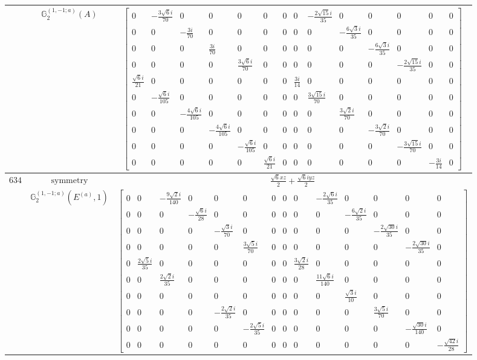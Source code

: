 \documentclass[fleqn,8pt,landscape]{jsarticle}
\begin{document}
\begin{longtable}{ccc}
$  $ & $ \mathbb{G}_{2}^{(1,-1;a)}(A) $ & $ \begin{bmatrix} 0 & - \frac{3 \sqrt{6} i}{70} & 0 & 0 & 0 & 0 & 0 & 0 & - \frac{2 \sqrt{15} i}{35} & 0 & 0 & 0 & 0 & 0 \\ 0 & 0 & - \frac{3 i}{70} & 0 & 0 & 0 & 0 & 0 & 0 & - \frac{6 \sqrt{3} i}{35} & 0 & 0 & 0 & 0 \\ 0 & 0 & 0 & \frac{3 i}{70} & 0 & 0 & 0 & 0 & 0 & 0 & - \frac{6 \sqrt{3} i}{35} & 0 & 0 & 0 \\ 0 & 0 & 0 & 0 & \frac{3 \sqrt{6} i}{70} & 0 & 0 & 0 & 0 & 0 & 0 & - \frac{2 \sqrt{15} i}{35} & 0 & 0 \\ \frac{\sqrt{6} i}{21} & 0 & 0 & 0 & 0 & 0 & 0 & \frac{3 i}{14} & 0 & 0 & 0 & 0 & 0 & 0 \\ 0 & - \frac{\sqrt{6} i}{105} & 0 & 0 & 0 & 0 & 0 & 0 & \frac{3 \sqrt{15} i}{70} & 0 & 0 & 0 & 0 & 0 \\ 0 & 0 & - \frac{4 \sqrt{6} i}{105} & 0 & 0 & 0 & 0 & 0 & 0 & \frac{3 \sqrt{2} i}{70} & 0 & 0 & 0 & 0 \\ 0 & 0 & 0 & - \frac{4 \sqrt{6} i}{105} & 0 & 0 & 0 & 0 & 0 & 0 & - \frac{3 \sqrt{2} i}{70} & 0 & 0 & 0 \\ 0 & 0 & 0 & 0 & - \frac{\sqrt{6} i}{105} & 0 & 0 & 0 & 0 & 0 & 0 & - \frac{3 \sqrt{15} i}{70} & 0 & 0 \\ 0 & 0 & 0 & 0 & 0 & \frac{\sqrt{6} i}{21} & 0 & 0 & 0 & 0 & 0 & 0 & - \frac{3 i}{14} & 0 \end{bmatrix} $ \\ \hline
$ 634 $ & $ \text{symmetry} $ & $ \frac{\sqrt{6} x z}{2} + \frac{\sqrt{6} i y z}{2} $ \\
$  $ & $ \mathbb{G}_{2}^{(1,-1;a)}(E^{(a)},1) $ & $ \begin{bmatrix} 0 & 0 & - \frac{9 \sqrt{2} i}{140} & 0 & 0 & 0 & 0 & 0 & 0 & - \frac{2 \sqrt{6} i}{35} & 0 & 0 & 0 & 0 \\ 0 & 0 & 0 & - \frac{\sqrt{6} i}{28} & 0 & 0 & 0 & 0 & 0 & 0 & - \frac{6 \sqrt{2} i}{35} & 0 & 0 & 0 \\ 0 & 0 & 0 & 0 & - \frac{\sqrt{3} i}{70} & 0 & 0 & 0 & 0 & 0 & 0 & - \frac{2 \sqrt{30} i}{35} & 0 & 0 \\ 0 & 0 & 0 & 0 & 0 & \frac{3 \sqrt{5} i}{70} & 0 & 0 & 0 & 0 & 0 & 0 & - \frac{2 \sqrt{30} i}{35} & 0 \\ 0 & \frac{2 \sqrt{5} i}{35} & 0 & 0 & 0 & 0 & 0 & 0 & \frac{3 \sqrt{2} i}{28} & 0 & 0 & 0 & 0 & 0 \\ 0 & 0 & \frac{2 \sqrt{2} i}{35} & 0 & 0 & 0 & 0 & 0 & 0 & \frac{11 \sqrt{6} i}{140} & 0 & 0 & 0 & 0 \\ 0 & 0 & 0 & 0 & 0 & 0 & 0 & 0 & 0 & 0 & \frac{\sqrt{3} i}{10} & 0 & 0 & 0 \\ 0 & 0 & 0 & 0 & - \frac{2 \sqrt{2} i}{35} & 0 & 0 & 0 & 0 & 0 & 0 & \frac{3 \sqrt{5} i}{70} & 0 & 0 \\ 0 & 0 & 0 & 0 & 0 & - \frac{2 \sqrt{5} i}{35} & 0 & 0 & 0 & 0 & 0 & 0 & - \frac{\sqrt{30} i}{140} & 0 \\ 0 & 0 & 0 & 0 & 0 & 0 & 0 & 0 & 0 & 0 & 0 & 0 & 0 & - \frac{\sqrt{42} i}{28} \end{bmatrix} $ \\ \hline

\end{longtable}
\end{document}
